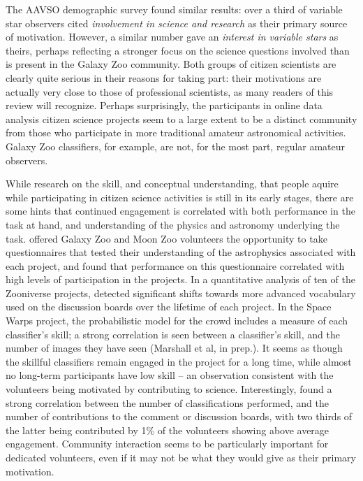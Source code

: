 \documentclass{ar2e}
\begin{document}
The AAVSO demographic survey \citep{P+P2012} found similar results: over a third
of variable star observers cited {\it involvement in science and research} as
their primary source of motivation. However, a similar number gave an {\it
interest in variable stars} as theirs, perhaps reflecting a stronger focus on
the science questions involved than is present in the Galaxy Zoo community. Both
groups of citizen scientists are clearly quite serious in their reasons for
taking part: their motivations are actually very close to those of professional
scientists, as many readers of this review will recognize. Perhaps surprisingly,
the participants in online data analysis citizen science projects seem to a
large extent to be a distinct community from those who participate in more
traditional amateur astronomical activities. Galaxy Zoo classifiers, for
example, are not, for the most part, regular amateur observers. 

While research on the skill, and conceptual understanding, that  people aquire
while participating in citizen science activities is still in its early stages,
there are some hints that continued engagement is correlated with both
performance in the task at hand, and understanding of the physics and astronomy
underlying the task. \citet{Prather++2013} offered Galaxy Zoo and Moon Zoo
volunteers the opportunity to take questionnaires that tested their
understanding of the astrophysics associated with each project, and found that
performance on this questionnaire correlated with high levels of participation
in the projects. In a quantitative analysis of ten of the Zooniverse projects,
\citet{LR2014} detected significant shifts towards more advanced vocabulary used
on the discussion boards over the lifetime of each project. In the Space Warps
project, the probabilistic model for the crowd includes a measure of each
classifier's skill; a strong correlation is seen between a classifier's skill,
and the number of images they have seen (Marshall et al, in prep.). It seems as
though the skillful classifiers remain engaged in the project for a long time,
while almost no long-term participants have low skill -- an observation
consistent with the volunteers being motivated by contributing to science.
Interestingly, \citet{LR2014} found a strong correlation between the number of
classifications performed, and the number of contributions to the comment or
discussion boards, with two thirds of the latter being contributed by 1\% of the
volunteers showing above average engagement. Community interaction seems to be
particularly important for dedicated volunteers, even if it may not be what they
would give as their primary motivation.
\end{document}
